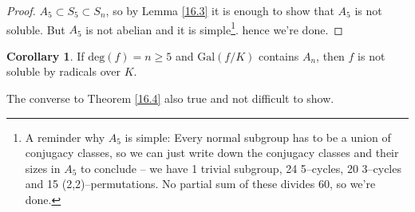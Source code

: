 \documentclass{article}
\theoremstyle{definition}
\newtheorem{cor}[theorem]{Corollary}
\begin{document}
\begin{proof}
    $A_5 \subset S_5 \subset S_n$, so by Lemma \ref{16.3} it is enough to show that $A_5$ is not soluble. But $A_5$ is not abelian and it is simple\footnote{A reminder why $A_5$ is simple: Every normal subgroup has to be a union of conjugacy classes, so we can just write down the conjugacy classes and their sizes in $A_5$ to conclude -- we have 1 trivial subgroup, 24 5--cycles, 20 3--cycles and 15 (2,2)--permutations. No partial sum of these divides 60, so we're done.}. hence we're done.
\end{proof}
\begin{cor}
    If $\text{deg}(f)=n\ge 5$ and $\text{Gal}(f/K)$ contains $A_n$, then $f$ is not soluble by radicals over $K$.
\end{cor}
The converse to Theorem \ref{16.4} also true and not difficult to show.
\end{document}
